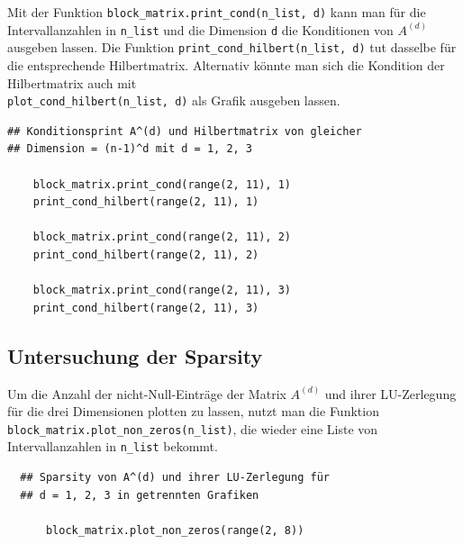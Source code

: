 \documentclass{scrartcl}
\begin{document}
Mit der Funktion \texttt{block\_matrix.print\_cond(n\_list, d)} kann man für die Intervallanzahlen in \texttt{n\_list} und die Dimension \texttt{d} die Konditionen von $A^{(d)}$ ausgeben lassen.
Die Funktion \texttt{print\_cond\_hilbert(n\_list, d)} tut dasselbe für die entsprechende Hilbertmatrix.
Alternativ könnte man sich die Kondition der Hilbertmatrix auch mit \\\texttt{plot\_cond\_hilbert(n\_list, d)} als Grafik ausgeben lassen.

\begin{verbatim}
## Konditionsprint A^(d) und Hilbertmatrix von gleicher
## Dimension = (n-1)^d mit d = 1, 2, 3

    block_matrix.print_cond(range(2, 11), 1)
    print_cond_hilbert(range(2, 11), 1)

    block_matrix.print_cond(range(2, 11), 2)
    print_cond_hilbert(range(2, 11), 2)

    block_matrix.print_cond(range(2, 11), 3)
    print_cond_hilbert(range(2, 11), 3)
\end{verbatim}

\subsection{Untersuchung der Sparsity}

Um die Anzahl der nicht-Null-Einträge der Matrix $A^{(d)}$ und ihrer LU-Zerlegung für die drei Dimensionen plotten zu lassen, nutzt man die Funktion \\\texttt{block\_matrix.plot\_non\_zeros(n\_list)}, die wieder eine Liste von Intervallanzahlen in \texttt{n\_list} bekommt.

\begin{verbatim}
  ## Sparsity von A^(d) und ihrer LU-Zerlegung für
  ## d = 1, 2, 3 in getrennten Grafiken

      block_matrix.plot_non_zeros(range(2, 8))
\end{verbatim}
\end{document}
